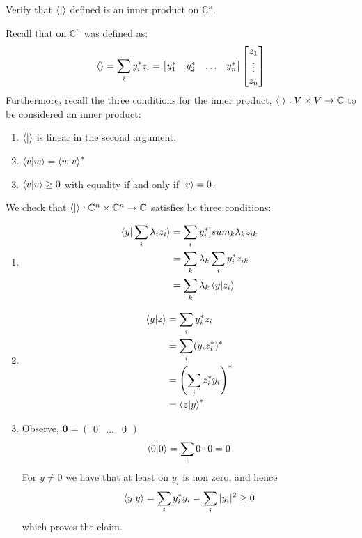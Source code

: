 \begin{example}
    Verify that $\braket{|}$ defined is an inner product on $\mathbb{C}^n$.

    Recall that on $\mathbb{C}^n$ was defined as:
    \[
    \braket{}=\sum_i y_i^*z_i=\begin{bmatrix} y_1^* & y_2^* & \ldots & y_n^* \end{bmatrix} \begin{bmatrix} z_1 \\ \vdots \\ z_n \end{bmatrix}
    \]
    Furthermore, recall the three conditions for the inner product, $\braket{|}:V \times V \rightarrow \mathbb{C}$ to be considered an inner product:
    \begin{enumerate}
        \item $\braket{|}$ is linear in the second argument.
        \item $\braket{v|w} =\braket{w|v}^*$
        \item $\braket{v|v}\geq 0$ with equality if and only if $\ket{v}=0$. 
    \end{enumerate}
    We check that $\braket{|}:\mathbb{C}^n \times \mathbb{C}^n\rightarrow \mathbb{C}$ satisfies he three conditions:
    \begin{enumerate}
    \item 
    \begin{align*}
    \braket{y|\sum_i \lambda_i z_i}&=\sum_iy_i^* ]sum_k \lambda_k z_{ik}\\
    &=\sum_k \lambda_k \sum_i y_i^* z_{ik}\\
    &=\sum_k \lambda_k \braket{y|z_i}
    \end{align*}    
    \item
    \begin{align*}
        \braket{y|z} &= \sum_i y_i^* z_i\\
        &= \sum_i (y_iz_i^*)^*\\
        &=\left(\sum_i z_i^*y_i\right)^*\\
        &=\braket{z|y}^*
    \end{align*}
    \item Observe, $\mathbf{0}=\begin{pmatrix} 0 & \ldots & 0 \end{pmatrix}$
    \[
    \braket{0|0}=\sum_i 0 \cdot 0 = 0
    \]
    For $y\neq 0$ we have that at least on $y_i$ is non zero, and hence
    \[
    \braket{y|y}=\sum_i y_i^*y_i=\sum_i|y_i|^2 \geq 0
    \]
    which proves the claim.
    \end{enumerate}
\end{example}
